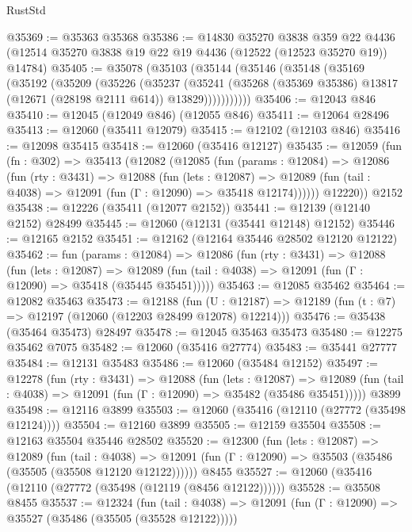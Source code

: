 \begin{lexlean}{RustStd}
\begin{coremodule}
@35369 := @35363 @35368
@35386 := @14830
    @35270
    @3838
    @359
    @22
    @4436
    (@12514 @35270 @3838 @19 @22 @19 @4436 (@12522 (@12523 @35270 @19)) @14784)
@35405 := @35078
    (@35103
      (@35144
        (@35146
          (@35148
            (@35169
              (@35192
                (@35209
                  (@35226
                    (@35237
                      (@35241
                        (@35268
                          (@35369 @35386)
                          @13817
                          (@12671 (@28198 @2111 @614))
                          @13829)))))))))))
@35406 := @12043 @846
@35410 := @12045 (@12049 @846) (@12055 @846)
@35411 := @12064 @28496
@35413 := @12060 (@35411 @12079)
@35415 := @12102 (@12103 @846)
@35416 := @12098 @35415
@35418 := @12060 (@35416 @12127)
@35435 := @12059
    (fun (fn : @302) =>
    @35413
      (@12082
        (@12085
          (fun (params : @12084) =>
          @12086
            (fun (rty : @3431) =>
            @12088
              (fun (lets : @12087) =>
              @12089 (fun (tail : @4038) => @12091 (fun (Γ : @12090) => @35418 @12174))))))
        @12220))
    @2152
@35438 := @12226 (@35411 (@12077 @2152))
@35441 := @12139 (@12140 @2152) @28499
@35445 := @12060 (@12131 (@35441 @12148) @12152)
@35446 := @12165 @2152
@35451 := @12162 (@12164 @35446 @28502 @12120 @12122)
@35462 := fun (params : @12084) =>
  @12086
    (fun (rty : @3431) =>
    @12088
      (fun (lets : @12087) =>
      @12089 (fun (tail : @4038) => @12091 (fun (Γ : @12090) => @35418 (@35445 @35451)))))
@35463 := @12085 @35462
@35464 := @12082 @35463
@35473 := @12188
    (fun (U : @12187) => @12189 (fun (t : @7) => @12197 (@12060 (@12203 @28499 @12078) @12214)))
@35476 := @35438 (@35464 @35473) @28497
@35478 := @12045 @35463 @35473
@35480 := @12275 @35462 @7075
@35482 := @12060 (@35416 @27774)
@35483 := @35441 @27777
@35484 := @12131 @35483
@35486 := @12060 (@35484 @12152)
@35497 := @12278
    (fun (rty : @3431) =>
    @12088
      (fun (lets : @12087) =>
      @12089 (fun (tail : @4038) => @12091 (fun (Γ : @12090) => @35482 (@35486 @35451)))))
    @3899
@35498 := @12116 @3899
@35503 := @12060 (@35416 (@12110 (@27772 (@35498 @12124))))
@35504 := @12160 @3899
@35505 := @12159 @35504
@35508 := @12163 @35504 @35446 @28502
@35520 := @12300
    (fun (lets : @12087) =>
    @12089
      (fun (tail : @4038) =>
      @12091 (fun (Γ : @12090) => @35503 (@35486 (@35505 (@35508 @12120 @12122))))))
    @8455
@35527 := @12060 (@35416 (@12110 (@27772 (@35498 (@12119 (@8456 @12122))))))
@35528 := @35508 @8455
@35537 := @12324
    (fun (tail : @4038) => @12091 (fun (Γ : @12090) => @35527 (@35486 (@35505 (@35528 @12122)))))

\end{coremodule}
\end{lexlean}

